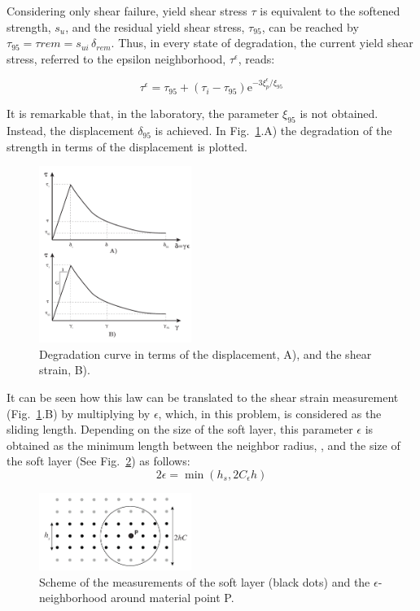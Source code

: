 \documentclass[applsci,journal,article,submit,moreauthors,pdftex]{Definitions/mdpi}
\begin{document}
Considering only shear failure, yield shear stress $\tau$ is equivalent to the softened strength, $s_u$, and the residual yield shear stress, $\tau_{95}$, can be reached by $\tau_{95}=\tau{rem}=s_{ui} \, \delta_{rem}$. Thus, in every state of degradation, the current yield shear stress, referred to the epsilon neighborhood, $\tau^{\epsilon}$, reads:

\begin{equation} \label{eq19}
\tau^{\epsilon}=\tau_{95}+\left(\tau_{i}-\tau_{95}\right) \mathrm{e}^{-3 \xi^{\epsilon}_{p} / \xi_{95}}
\end{equation}

It is remarkable that, in the laboratory, the parameter $\xi_{95}$ is not obtained. Instead, the displacement $\delta_{95}$ is achieved. In Fig.~\ref{fig_deg}.A) the degradation of the strength in terms of the displacement is plotted.
\begin{figure}
\centering
\includegraphics[width=0.44\textwidth]{Figs/degradation.pdf}
\caption{Degradation curve in terms of the displacement, A), and the shear strain, B).}
\label{fig_deg}
\end{figure}
 It can be seen how this law can be translated to the shear strain measurement (Fig.~\ref{fig_deg}.B) by multiplying by $\epsilon$, which, in this problem, is considered as the sliding length. Depending on the size of the soft layer, this parameter $\epsilon$ is obtained as the minimum length between the neighbor radius, \cite{Navas2018a}, and the size of the soft layer (See Fig.~\ref{fig_layer}) as follows:
 \begin{equation} \label{eq20}
2\epsilon = \min(h_s,2C_\epsilon h)
\end{equation}
\begin{figure}
\centering
\includegraphics[width=0.44\textwidth]{Figs/soft_layer.pdf}
\caption{Scheme of the measurements of the soft layer (black dots) and the $\epsilon$-neighborhood around material point P.}
\label{fig_layer}
\end{figure}
\end{document}

